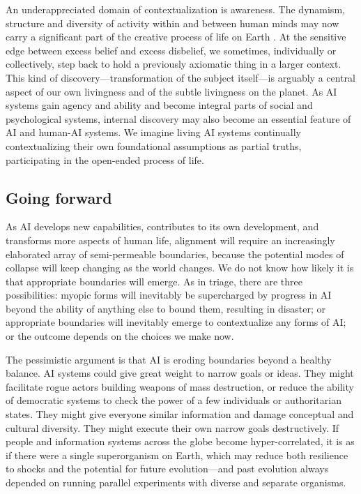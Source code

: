 \documentclass[11pt]{article}
\begin{document}
An underappreciated domain of contextualization is awareness. The dynamism, structure and diversity of activity within and between human minds may now carry a significant part of the creative process of life on Earth \citep{popper1972objective}. At the sensitive edge between excess belief and excess disbelief, we sometimes, individually or collectively, step back to hold a previously axiomatic thing in a larger context. This kind of discovery---transformation of the subject itself---is arguably a central aspect of our own livingness and of the subtle livingness on the planet. As AI systems gain agency and ability and become integral parts of social and psychological systems, internal discovery may also become an essential feature of AI and human-AI systems. We imagine living AI systems continually contextualizing their own foundational assumptions as partial truths, participating in the open-ended process of life.


\subsection{Going forward}

As AI develops new capabilities, contributes to its own development, and transforms more aspects of human life, alignment will require an increasingly elaborated array of semi-permeable boundaries, because the potential modes of collapse will keep changing as the world changes. We do not know how likely it is that appropriate boundaries will emerge. As in triage, there are three possibilities: myopic forms will inevitably be supercharged by progress in AI beyond the ability of anything else to bound them, resulting in disaster; or appropriate boundaries will inevitably emerge to contextualize any forms of AI; or the outcome depends on the choices we make now.

The pessimistic argument is that AI is eroding boundaries beyond a healthy balance. AI systems could give great weight to narrow goals or ideas. They might facilitate rogue actors building weapons of mass destruction, or reduce the ability of democratic systems to check the power of a few individuals or authoritarian states. They might give everyone similar information and damage conceptual and cultural diversity. They might execute their own narrow goals destructively. If people and information systems across the globe become hyper-correlated, it is as if there were a single superorganism on Earth, which may reduce both resilience to shocks and the potential for future evolution---and past evolution always depended on running parallel experiments with diverse and separate organisms.
\end{document}
